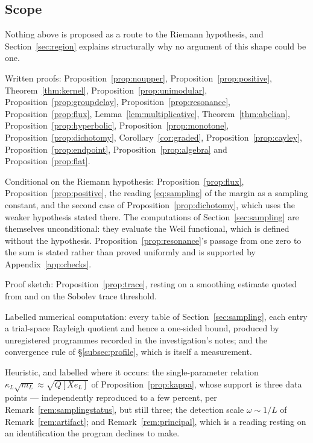 \subsection{Scope}

Nothing above is proposed as a route to the Riemann hypothesis, and
Section~\ref{sec:region} explains structurally why no argument of this shape could
be one.

Written proofs: Proposition~\ref{prop:noupper}, Proposition~\ref{prop:positive},
Theorem~\ref{thm:kernel}, Proposition~\ref{prop:unimodular},
Proposition~\ref{prop:groupdelay}, Proposition~\ref{prop:resonance},
Proposition~\ref{prop:flux}, Lemma~\ref{lem:multiplicative},
Theorem~\ref{thm:abelian}, Proposition~\ref{prop:hyperbolic},
Proposition~\ref{prop:monotone}, Proposition~\ref{prop:dichotomy},
Corollary~\ref{cor:graded}, Proposition~\ref{prop:cayley},
Proposition~\ref{prop:endpoint}, Proposition~\ref{prop:algebra} and
Proposition~\ref{prop:flat}.

Conditional on the Riemann hypothesis: Proposition~\ref{prop:flux},
Proposition~\ref{prop:positive}, the reading \eqref{eq:sampling} of the margin as
a sampling constant, and the second case of Proposition~\ref{prop:dichotomy},
which uses the weaker hypothesis stated there. The computations of
Section~\ref{sec:sampling} are themselves unconditional: they evaluate the Weil
functional, which is defined without the hypothesis. Proposition~\ref{prop:resonance}'s passage from one zero to the sum is
stated rather than proved uniformly and is supported by
Appendix~\ref{app:checks}.

Proof sketch: Proposition~\ref{prop:trace}, resting on a smoothing estimate
quoted from \cite{Background} and on the Sobolev trace threshold.

Labelled numerical computation: every table of Section~\ref{sec:sampling}, each
entry a trial-space Rayleigh quotient and hence a one-sided bound, produced by
unregistered programmes recorded in the investigation's notes; and the
convergence rule of \S\ref{subsec:profile}, which is itself a measurement.

Heuristic, and labelled where it occurs: the single-parameter relation
$\kappa_L\sqrt{m_L}\approx\sqrt{Q[Xe_L]}$ of Proposition~\ref{prop:kappa}, whose
support is three data points --- independently reproduced to a few percent, per
Remark~\ref{rem:samplingstatus}, but still three; the detection scale $\omega\sim1/L$ of
Remark~\ref{rem:artifact}; and Remark~\ref{rem:principal}, which is a reading
resting on an identification the program declines to make.

